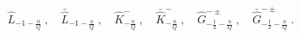 \begin{equation}
 \hat L_{-1-\frac{n}{Q}} ~, \quad \bar{\hat L}_{-1-\frac{n}{Q}} ~,\quad
 \hat K^-_{-\frac{n}{Q}} ~, \quad \bar{\hat K}^-_{-\frac{n}{Q}} ~,\quad
 \hat G^{-\pm}_{-\frac12 -\frac{n}{Q}} ~, 
 \quad \bar{\hat G}^{-\pm}_{-\frac12-\frac{n}{Q}}~.
\end{equation}

